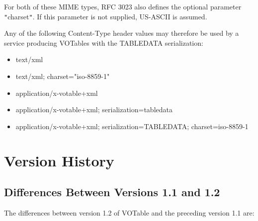 \documentclass[11pt,a4paper]{ivoa}
\let\fg=\color
\def\literalvalue#1{{\tt"}{{\fg{DarkPurple}#1}}{\tt"}}
\begin{document}
{{{For both of these MIME types, RFC 3023 also defines the optional
parameter {\literalvalue{\textsf{charset}}}.
If this parameter is not supplied, US-ASCII is assumed.

Any of the following Content-Type header values may therefore be used
by a service producing VOTables with the TABLEDATA serialization:
\begin{itemize}
  \item {\textsf{text/xml}}
  \item {\textsf{text/xml; charset={"}iso-8859-1"}}
  \item {\textsf{application/x-votable+xml}}
  \item {\textsf{application/x-votable+xml; serialization=tabledata}}
  \item {\textsf{application/x-votable+xml; serialization=TABLEDATA; charset=iso-8859-1}}
\end{itemize}


\section{Version History}
\label{diff}

\subsection{Differences Between Versions 1.1 and 1.2}
\label{diff1.1-1.2}
The differences between version 1.2 of VOTable and the preceding
version 1.1 are:

}}}
\end{document}
